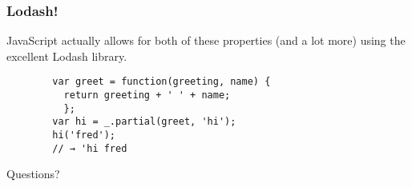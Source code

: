 \documentclass{beamer}
\begin{document}
\begin{frame}[fragile]
	\frametitle{Lodash!}
		JavaScript actually allows for both of these properties (and a lot more) using the excellent Lodash library.
	\begin{lstlisting}
		var greet = function(greeting, name) { 
		  return greeting + ' ' + name; 
		  };
		var hi = _.partial(greet, 'hi');
		hi('fred');
		// → 'hi fred
	\end{lstlisting}
\end{frame}
\begin{frame}
	\begin{center}
		Questions?
	\end{center}
	
\end{frame}
\end{document}
